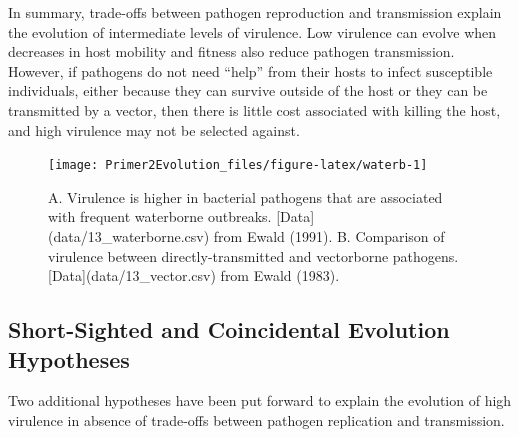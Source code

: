 \documentclass[
]{book}
\begin{document}
In summary, trade-offs between pathogen reproduction and transmission explain the evolution of intermediate levels of virulence. Low virulence can evolve when decreases in host mobility and fitness also reduce pathogen transmission. However, if pathogens do not need ``help'' from their hosts to infect susceptible individuals, either because they can survive outside of the host or they can be transmitted by a vector, then there is little cost associated with killing the host, and high virulence may not be selected against.

\begin{figure}
\texttt{[image: Primer2Evolution\_files/figure-latex/waterb-1]} \caption{A. Virulence is higher in bacterial pathogens that are associated with frequent waterborne outbreaks. [Data](data/13_waterborne.csv) from Ewald (1991). B. Comparison of virulence between directly-transmitted and vectorborne pathogens. [Data](data/13_vector.csv) from Ewald (1983).}\label{fig:waterb}
\end{figure}

\hypertarget{short-sighted-and-coincidental-evolution-hypotheses}{%
\subsection{Short-Sighted and Coincidental Evolution Hypotheses}\label{short-sighted-and-coincidental-evolution-hypotheses}}

Two additional hypotheses have been put forward to explain the evolution of high virulence in absence of trade-offs between pathogen replication and transmission.
\end{document}
